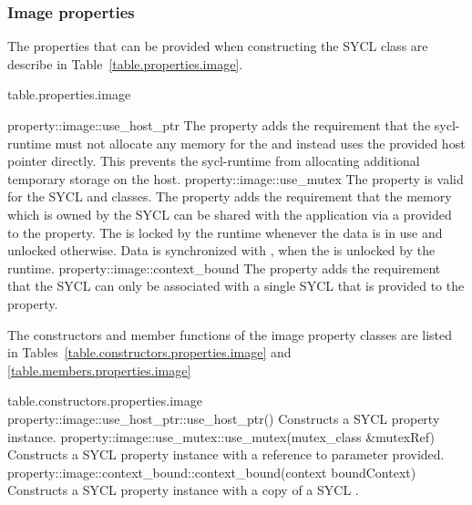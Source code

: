 \subsubsection{Image properties}
\label{sec:image-properties}

The properties that can be provided when constructing the SYCL  class are describe in Table~\ref{table.properties.image}.

 {table.properties.image}

\addRow
  { property::image::use_host_ptr }
  {
    The  property adds the requirement that the \gls{sycl-runtime} must not allocate any memory for the  and instead uses the provided host pointer directly. This prevents the \gls{sycl-runtime} from allocating additional temporary storage on the host.
  }
\addRow
  { property::image::use_mutex }
  {
    The  property is valid for the SYCL  and  classes. The property adds the requirement that the memory which is owned by the SYCL  can be shared with the application via a  provided to the property. The   is locked by the runtime whenever the data is in use and unlocked otherwise. Data is synchronized with , when the  is unlocked by the runtime.
  }
\addRow
  { property::image::context_bound }
  {
    The  property adds the requirement that the SYCL  can only be associated with a single SYCL  that is provided to the property.
  }
\completeTable

The constructors and member functions of the image property classes
are listed in Tables~\ref{table.constructors.properties.image} and
\ref{table.members.properties.image}

{table.constructors.properties.image}
\addRow
{property::image::use_host_ptr::use_host_ptr()}
{
  Constructs a SYCL  property instance.
}
\addRow
{property::image::use_mutex::use_mutex(mutex_class \&mutexRef)}
{
  Constructs a SYCL  property instance with a reference to  parameter provided.
}
\addRow
{property::image::context_bound::context_bound(context boundContext)}
{
  Constructs a SYCL  property instance with a copy of a SYCL .
}
\completeTable

